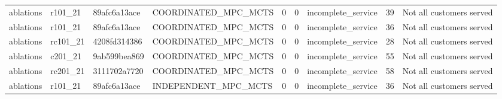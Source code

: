 \begin{table}
{\begin{tabular}{llllrrlrl}
ablations & r101\_21 & 89afc6a13ace & COORDINATED\_MPC\_MCTS & 0 & 0 & incomplete\_service & 39 & Not all customers served \\
ablations & r101\_21 & 89afc6a13ace & COORDINATED\_MPC\_MCTS & 0 & 0 & incomplete\_service & 36 & Not all customers served \\
ablations & rc101\_21 & 4208fd314386 & COORDINATED\_MPC\_MCTS & 0 & 0 & incomplete\_service & 28 & Not all customers served \\
ablations & c201\_21 & 9ab599bea869 & COORDINATED\_MPC\_MCTS & 0 & 0 & incomplete\_service & 55 & Not all customers served \\
ablations & rc201\_21 & 3111702a7720 & COORDINATED\_MPC\_MCTS & 0 & 0 & incomplete\_service & 58 & Not all customers served \\
ablations & r101\_21 & 89afc6a13ace & INDEPENDENT\_MPC\_MCTS & 0 & 0 & incomplete\_service & 36 & Not all customers served \\
\bottomrule
\end{tabular}
}
\end{table}
